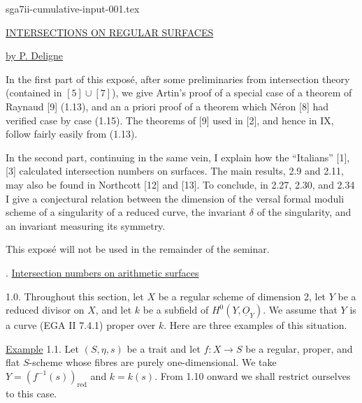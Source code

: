 \begin{filecontents*}{sga7ii-cumulative-input-001.tex}

\begin{center}
\underline{INTERSECTIONS ON REGULAR SURFACES}

\medskip
\underline{by P. Deligne}
\end{center}

In the first part of this exposé, after some preliminaries from intersection theory
(contained in $[5]\cup[7]$), we give Artin's proof of a special case of a theorem of
Raynaud [9] (1.13), and an a priori proof of a theorem which Néron [8] had verified
case by case (1.15).  The theorems of [9] used in [2], and hence in IX, follow fairly
easily from (1.13).

In the second part, continuing in the same vein, I explain how the ``Italians'' [1],
[3] calculated intersection numbers on surfaces.  The main results, 2.9 and 2.11,
may also be found in Northcott [12] and [13].  To conclude, in 2.27, 2.30, and 2.34
I give a conjectural relation between the dimension of the versal formal moduli
scheme of a singularity of a reduced curve, the invariant $\delta$ of the singularity,
and an invariant measuring its symmetry.

This exposé will not be used in the remainder of the seminar.

. \underline{Intersection numbers on arithmetic surfaces}

1.0. Throughout this section, let $X$ be a regular scheme of dimension 2, let $Y$ be
a reduced divisor on $X$, and let $k$ be a subfield of
$H^0(Y,\underline{O}_Y)$.  We assume that $Y$ is a curve (EGA II 7.4.1) proper over
$k$.  Here are three examples of this situation.

\underline{Example} 1.1. Let $(S,\eta,s)$ be a trait and let
$f:X\longrightarrow S$ be a regular, proper, and flat $S$-scheme whose fibres are
purely one-dimensional.  We take $Y=(f^{-1}(s))_{\mathrm{red}}$ and $k=k(s)$.  From
1.10 onward we shall restrict ourselves to this case.


\end{filecontents*}
